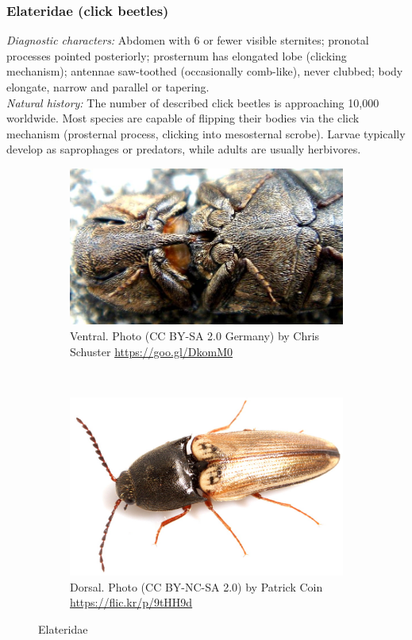 \documentclass[letterpaper, 11pt]{article}
\begin{document}
\subsubsection{Elateridae (click beetles)}
\noindent{}\textit{Diagnostic characters:} Abdomen with 6 or fewer visible sternites; pronotal processes pointed posteriorly; prosternum has elongated lobe (clicking mechanism); antennae saw-toothed (occasionally comb-like), never clubbed; body elongate, narrow and parallel or tapering.\\

\noindent{}\textit{Natural history:} The number of described click beetles is approaching 10,000 worldwide. Most species are capable of flipping their bodies via the click mechanism (prosternal process, clicking into mesosternal scrobe). Larvae typically develop as saprophages or predators, while adults are usually herbivores.

\begin{figure}[ht!]
  \centering
\begin{subfigure}[ht!]{0.4\textwidth}
    \includegraphics[width=\textwidth]{ElateridVentral}
  \caption{Ventral. Photo (CC BY-SA 2.0 Germany) by Chris Schuster \url{https://goo.gl/DkomM0}}
  \label{fig:elaterid1}
\end{subfigure}
    ~
\begin{subfigure}[ht!]{0.45\textwidth}
    \includegraphics[width=\textwidth]{ElateridHabitus}
  \caption{Dorsal. Photo (CC BY-NC-SA 2.0) by Patrick Coin \url{https://flic.kr/p/9tHH9d}}
  \label{fig:elaterid2}\end{subfigure}
    \caption{Elateridae}\label{fig:elaterids}
\end{figure}
\end{document}
